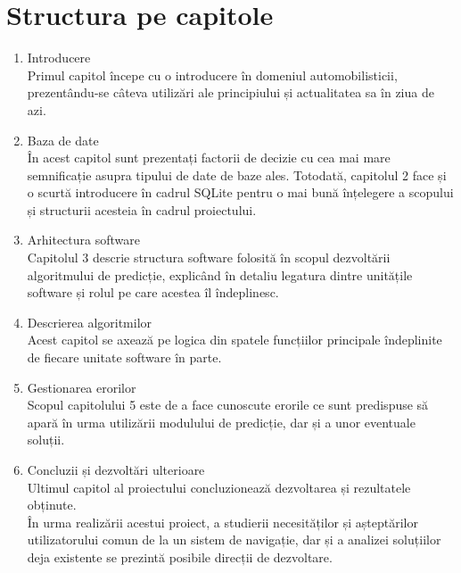 \section{Structura pe capitole} 
	\begin{enumerate}
	 \setlength\itemsep{0em}
		\item Introducere\\
		Primul capitol începe cu o introducere în domeniul automobilisticii, prezentându-se câteva utilizări ale principiului și actualitatea sa în ziua de azi.
		
	    \item Baza de date\\
	    În acest capitol sunt prezentați factorii de decizie cu cea mai mare semnificație asupra tipului de date de baze ales. Totodată, capitolul 2 face și o scurtă introducere în cadrul SQLite pentru o mai bună înțelegere a scopului și structurii acesteia în cadrul proiectului.
	    
		\item Arhitectura software\\
		Capitolul 3 descrie structura software folosită în scopul dezvoltării algoritmului de predicție, explicând în detaliu legatura dintre unitățile software și rolul pe care acestea îl
îndeplinesc.

		\item Descrierea algoritmilor\\
		Acest capitol se axează pe logica din spatele funcțiilor principale îndeplinite de fiecare unitate software în parte.
		
		\item Gestionarea erorilor\\
		Scopul capitolului 5 este de a face cunoscute erorile ce sunt predispuse să apară în urma utilizării modulului de predicție, dar și a unor eventuale soluții.
		
		\item Concluzii și dezvoltări ulterioare\\
		Ultimul capitol al proiectului concluzionează dezvoltarea și rezultatele obținute. \\
		În urma realizării acestui proiect, a studierii necesităților și așteptărilor utilizatorului comun de la un sistem de navigație, dar și a analizei soluțiilor deja existente se prezintă posibile direcții de dezvoltare.
	\end{enumerate}